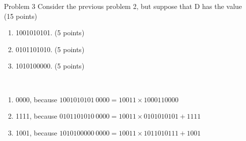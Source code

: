 \begin{exercise}[]{Problem 3 Consider the previous problem 2, but suppose that D has the value (15 points)
    \begin{enumerate}
        \item 1001010101. (5 points)
        \item 0101101010. (5 points)
        \item 1010100000. (5 points)
    \end{enumerate} }
  \begin{solution}
  \par{~}
  \begin{enumerate}
    \item 0000, because $1001010101 \ 0000= 10011 \times 1000110000$
    \item 1111, because $0101101010 \ 0000= 10011 \times 0101010101 + 1111$
    \item 1001, because $1010100000 \ 0000= 10011 \times 1011010111 + 1001$
  \end{enumerate}
  \end{solution}
  \label{ex3}
\end{exercise}

\newpage

